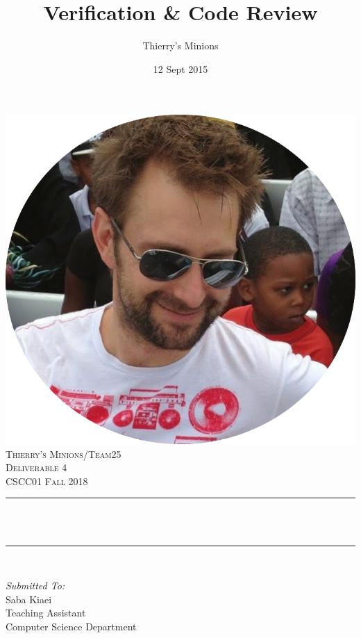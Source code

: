 \documentclass[12pt]{article}
\title{Verification \& Code Review}								%
\author{Thierry's Minions}								%
\date{12 Sept 2015}											%
\makeatletter
\let\thetitle\@title
\makeatother
\begin{document}

\begin{titlepage}
	\centering
    \vspace*{0.5 cm}
    \includegraphics[scale = 0.25]{leader.png}\\[1.0 cm]	%
    \textsc{\LARGE Thierry's Minions/Team25\\[0.5em] Deliverable 4}\\[2.0 cm]	
	\textsc{\Large CSCC01 Fall 2018}\\[0.5 cm]				%
	\rule{\linewidth}{0.2 mm} \\[0.4 cm]
	{ \huge \bfseries \thetitle}\\
	\rule{\linewidth}{0.2 mm} \\[1.5 cm]
	
	\begin{minipage}{0.4\textwidth}
		\begin{flushleft} \large
			\emph{Submitted To:}\\
			Saba Kiaei\\
            Teaching Assistant\\
            Computer Science Department\\
			\end{flushleft}
			\end{minipage}~
			\begin{minipage}{0.4\textwidth}
            

\end{minipage}
\end{titlepage}
\end{document}
